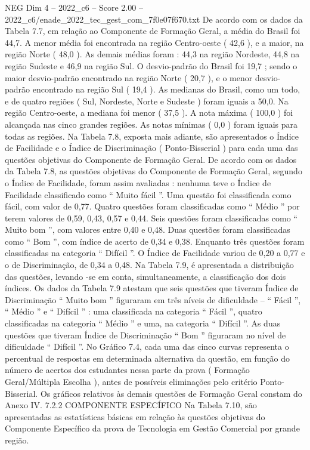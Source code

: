 \begin{textsample}{NEG Dim 4 – 2022\_c6 – Score 2.00 – 2022\_c6/enade\_2022\_tec\_gest\_com\_7f0e07f670.txt}
De acordo com os dados da Tabela 7.7, em relação ao Componente de Formação Geral, a média do Brasil foi 44,7.
A menor média foi encontrada na região Centro-oeste ( 42,6 ), e a maior, na região Norte ( 48,0 ).
As demais médias foram : 44,3 na região Nordeste, 44,8 na região Sudeste e 46,9 na região Sul.
O desvio-padrão do Brasil foi 19,7 ; sendo o maior desvio-padrão encontrado na região Norte ( 20,7 ), e o menor desvio-padrão encontrado na região Sul ( 19,4 ).
As medianas do Brasil, como um todo, e de quatro regiões ( Sul, Nordeste, Norte e Sudeste ) foram iguais a 50,0.
Na região Centro-oeste, a mediana foi menor ( 37,5 ).
A nota máxima ( 100,0 ) foi alcançada nas cinco grandes regiões.
As notas mínimas ( 0,0 ) foram iguais para todas as regiões.
Na Tabela 7.8, exposta mais adiante, são apresentados o Índice de Facilidade e o Índice de Discriminação ( Ponto-Bisserial ) para cada uma das questões objetivas do Componente de Formação Geral.
De acordo com os dados da Tabela 7.8, as questões objetivas do Componente de Formação Geral, segundo o Índice de Facilidade, foram assim avaliadas : nenhuma teve o Índice de Facilidade classificado como “ Muito fácil ”.
Uma questão foi classificada como fácil, com valor de 0,77.
Quatro questões foram classificadas como “ Médio ” por terem valores de 0,59, 0,43, 0,57 e 0,44.
Seis questões foram classificadas como “ Muito bom ”, com valores entre 0,40 e 0,48.
Duas questões foram classificadas como “ Bom ”, com índice de acerto de 0,34 e 0,38.
Enquanto três questões foram classificadas na categoria “ Difícil ”.
O Índice de Facilidade variou de 0,20 a 0,77 e o de Discriminação, de 0,34 a 0,48.
Na Tabela 7.9, é apresentada a distribuição das questões, levando -se em conta, simultaneamente, a classificação dos dois índices.
Os dados da Tabela 7.9 atestam que seis questões que tiveram Índice de Discriminação “ Muito bom ” figuraram em três níveis de dificuldade – “ Fácil ”, “ Médio ” e “ Difícil ” : uma classificada na categoria “ Fácil ”, quatro classificadas na categoria “ Médio ” e uma, na categoria “ Difícil ”.
As duas questões que tiveram Índice de Discriminação “ Bom ” figuraram no nível de dificuldade “ Difícil ”.
No Gráfico 7.4, cada uma das cinco curvas representa o percentual de respostas em determinada alternativa da questão, em função do número de acertos dos estudantes nessa parte da prova ( Formação Geral/Múltipla Escolha ), antes de possíveis eliminações pelo critério Ponto-Bisserial.
Os gráficos relativos às demais questões de Formação Geral constam do Anexo IV. 7.2.2 COMPONENTE ESPECÍFICO Na Tabela 7.10, são apresentadas as estatísticas básicas em relação às questões objetivas do Componente Específico da prova de Tecnologia em Gestão Comercial por grande região.

\end{textsample}
